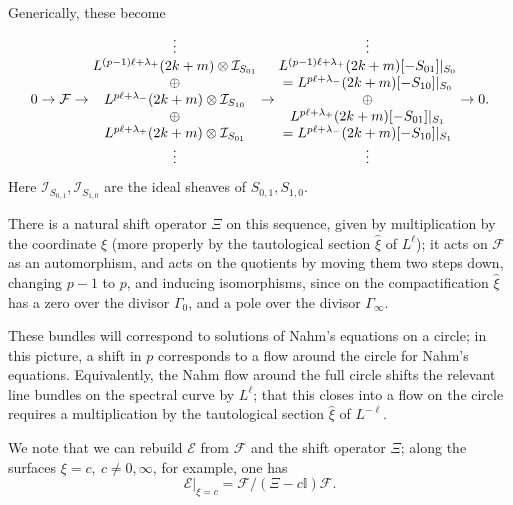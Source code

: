 \documentclass[12pt]{article}
\theoremstyle{definition}
\theoremstyle{remark}
\numberwithin{theorem}{section}
\def\bI{{\mathbb {I}}}
\def\pE{{\mathcal E}}
\def\pF{{\mathcal F}}
\def\pI{{\mathcal I}}
\begin{document}
%
Generically, these become 
%
\begin{equation*}\label{sequence}
0\rightarrow
\pF\rightarrow\begin{matrix}
\vdots\\ L^{(p-1)\ell+\lambda_+}(2k+m)\otimes{\cal I}_{S_{01}}\\ \oplus\\
L^{p\ell+\lambda_-}(2k+m)\otimes{\cal I}_{S_{10}}\\ \oplus\\
L^{p\ell+\lambda_+}(2k+m)\otimes{\cal I}_{S_{01}}\\ \vdots\end{matrix}\nonumber
\rightarrow
\begin{matrix}
\vdots\\ L^{(p-1)\ell+\lambda_+}(2k+m)[-S_{01}]|_{S_0}\\
=L^{p\ell+\lambda_-}(2k+m)[-S_{10}]|_{S_0}\\ \oplus\\
L^{p\ell+\lambda_+}(2k+m)[-S_{01}]|_{S_1}\\ = L^{p\ell+\lambda_-}(2k+m)[-S_{10}]|_{S_1}\\
\vdots\end{matrix}
\rightarrow0.
\end{equation*}
Here $ \pI_{S_{0,1}},  \pI_{S_{1,0}}$ are the ideal sheaves of $S_{0,1}, S_{1,0}$. 

There is a natural shift operator $\Xi$ on this sequence, given by multiplication by the coordinate $\xi$ (more properly by the tautological section $\hat \xi$ of $L^{\ell}$); it acts on $\pF$ as an automorphism, and acts on the quotients by moving them two steps down, changing $p-1$ to $p$, and inducing isomorphisms, since  on the compactification   $\hat \xi$ 
has a zero over the divisor $\Gamma_0$, and a pole over the divisor $\Gamma_\infty$. 

These bundles will correspond to solutions of Nahm's equations on a circle; in this picture,  a shift in $p$ corresponds to a flow around the circle for Nahm's equations.  Equivalently,  the Nahm flow around the full circle shifts the relevant line bundles on the spectral curve by $L^{\ell}$; that this closes into a flow on the circle requires a multiplication by the tautological section $\hat \xi$ of $L^{-\ell}$.
  
We note that we can rebuild $\pE$ from $\pF$ and the shift operator   $\Xi$; along the surfaces $\xi = c,\ c\neq 0,\infty$, for example, one has 
$$\pE|_{\xi= c} = \pF/ (\Xi-c\bI)\pF.$$
 
\end{document}
